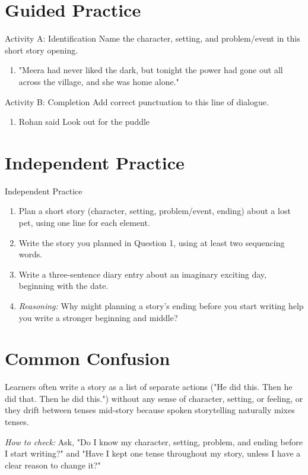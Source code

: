 \section{Guided Practice}
\begin{activitybox}{Activity A: Identification}
Name the character, setting, and problem/event in this short story opening.
\begin{enumerate}
    \item "Meera had never liked the dark, but tonight the power had gone out all across the village, and she was home alone."
\end{enumerate}
\end{activitybox}

\begin{activitybox}{Activity B: Completion}
Add correct punctuation to this line of dialogue.
\begin{enumerate}
    \item Rohan said Look out for the puddle
\end{enumerate}
\end{activitybox}

\section{Independent Practice}
\begin{activitybox}{Independent Practice}
\begin{enumerate}
    \item Plan a short story (character, setting, problem/event, ending) about a lost pet, using one line for each element.
    \item Write the story you planned in Question 1, using at least two sequencing words.
    \item Write a three-sentence diary entry about an imaginary exciting day, beginning with the date.
    \item \textit{Reasoning:} Why might planning a story's ending before you start writing help you write a stronger beginning and middle?
\end{enumerate}
\end{activitybox}

\section{Common Confusion}
\begin{warningbox}
Learners often write a story as a list of separate actions ("He did this. Then he did that. Then he did this.") without any sense of character, setting, or feeling, or they drift between tenses mid-story because spoken storytelling naturally mixes tenses.

\textit{How to check:} Ask, "Do I know my character, setting, problem, and ending before I start writing?" and "Have I kept one tense throughout my story, unless I have a clear reason to change it?"
\end{warningbox}

